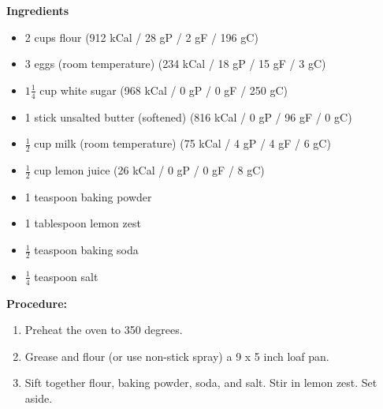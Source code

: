 \documentclass{report}
\begin{document}


\bigskip

\bigskip

\begin{multicols}{2}
\textbf{Ingredients} 
\begin{itemize}
\item 2 cups flour \quad (912 kCal / 28 gP / 2 gF / 196 gC)
\item 3 eggs (room temperature)  \newline (234 kCal / 18 gP / 15 gF / 3 gC)
\item $1\frac{1}{4}$ cup white sugar (968 kCal / 0 gP / 0 gF / 250 gC)
\item 1 stick unsalted butter (softened) \newline (816 kCal / 0 gP / 96 gF / 0 gC)
\item $\frac{1}{2}$ cup milk (room temperature) \newline (75 kCal / 4 gP / 4 gF / 6 gC)
\item $\frac{1}{2}$ cup lemon juice \quad (26 kCal / 0 gP / 0 gF / 8 gC)
\item 1 teaspoon baking powder
\item 1 tablespoon lemon zest
\item $\frac{1}{2}$ teaspoon baking soda 
\item $\frac{1}{4}$ teaspoon salt




\end{itemize}


\columnbreak
\textbf{Procedure:}
\medskip


\begin{enumerate}
\item Preheat the oven to 350 degrees. 


\medskip
\item Grease and flour (or use non-stick spray) a 9 x 5 inch loaf pan.
\medskip

\item Sift together flour, baking powder, soda, and salt. Stir in lemon zest. Set aside.



\end{enumerate}
\end{multicols}
\end{document}
